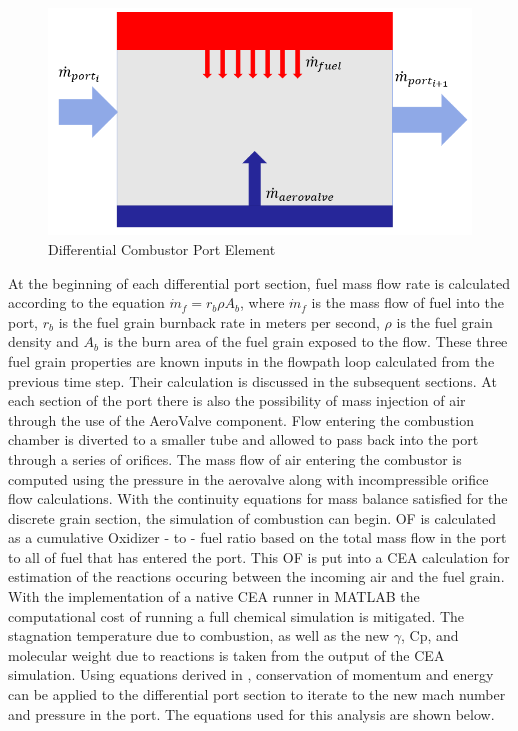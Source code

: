 \begin{figure}[hbt]
\centering
\includegraphics[width=.5\textwidth] {Combustor_Figures/grain_sections.PNG}
\caption{Differential Combustor Port Element}
\label{fig:controlvolume}
\end{figure}

At the beginning of each differential port section, fuel mass flow rate is calculated according to the equation $\dot{m}_f=r_b  \rho  A_b$, where $\dot{m}_f$ is the mass flow of fuel into the port, $r_b$ is the fuel grain burnback rate in meters per second, $\rho$ is the fuel grain density and $A_b$ is the burn area of the fuel grain exposed to the flow. These three fuel grain properties are known inputs in the flowpath loop calculated from the previous time step. Their calculation is discussed in the subsequent sections. At each section of the port there is also the possibility of mass injection of air through the use of the AeroValve component. Flow entering the combustion chamber is diverted to a smaller tube and allowed to pass back into the port through a series of orifices. The mass flow of air entering the combustor is computed using the pressure in the aerovalve along with incompressible orifice flow calculations. With the continuity equations for mass balance satisfied for the discrete grain section, the simulation of combustion can begin. OF is calculated as a cumulative Oxidizer - to - fuel ratio based on the total mass flow in the port to all of fuel that has entered the port. This OF is put into a CEA calculation for estimation of the reactions occuring between the incoming air and the fuel grain. With the implementation of a native CEA runner in MATLAB the computational cost of running  a full chemical simulation is mitigated. The stagnation temperature due to combustion, as well as the new $\gamma$, Cp, and molecular weight due to reactions is taken from the output of the CEA simulation. Using equations derived in \cite{hyball}, conservation of momentum and energy can be applied to the differential port section to iterate to the new mach number and pressure in the port. The equations used for this analysis are shown below.  \\ \indent

